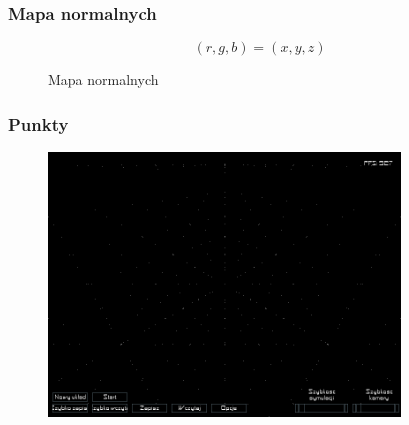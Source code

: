 \documentclass{beamer}
\begin{document}
\frame
{
	\frametitle{Mapa normalnych}
	
	$$ (r,g,b) = (x,y,z) $$

	\begin{figure}
	\centering
	\caption{Mapa normalnych}
	 \hspace{.0\textwidth}
	\pause
	\label{fig:normmap}
	\end{figure}
	\setcounter{subfigure}{0}
}

\frame
{
	\frametitle{Punkty}
	\begin{figure}
	\centering
		\includegraphics[height=7cm]{img/orto1.png}
	\label{fig:orto1}
	\end{figure}
	\setcounter{subfigure}{0}
}
\end{document}
